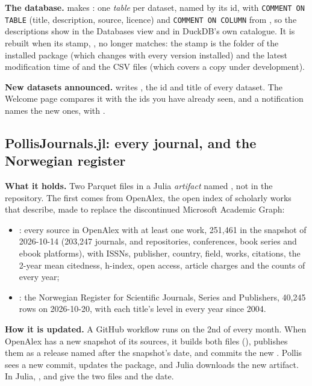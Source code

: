 \textbf{The database.}  makes : one
\emph{table} per dataset, named by its id, with \texttt{\small COMMENT ON TABLE} (title, description, source, licence) and
\texttt{\small COMMENT ON COLUMN} from , so the descriptions show in the Databases view and in DuckDB's own
catalogue. It is rebuilt when its stamp, , no longer matches: the stamp is the
folder of the installed package (which changes with every version installed) and the latest modification time of
 and the CSV files (which covers a copy under development).

\textbf{New datasets announced.}  writes ,
the id and title of every dataset. The Welcome page compares it with the ids you have already seen, and a notification
names the new ones, with .

\subsection{PollisJournals.jl: every journal, and the Norwegian register}
\textbf{What it holds.} Two Parquet files in a Julia \emph{artifact} named , not in the repository. The
first comes from OpenAlex, the open index of scholarly works that 
describe, made to replace the discontinued Microsoft Academic Graph:
\begin{itemize}
  \item {}: every source in OpenAlex with at least one work, 251,461 in the snapshot of
    2026-10-14 (203,247 journals, and repositories, conferences, book series and ebook platforms), with ISSNs,
    publisher, country, field, works, citations, the 2-year mean citedness, h-index, open access, article charges and
    the counts of every year;
  \item {}: the Norwegian Register for Scientific Journals, Series and Publishers, 40,245 rows on
    2026-10-20, with each title's level in every year since 2004.
\end{itemize}

\textbf{How it is updated.} A GitHub workflow runs on the 2nd of every month. When OpenAlex has a new snapshot of its
sources, it builds both files (), publishes them as a release named after the snapshot's date, and
commits the new . Pollis sees a new commit, updates the package, and Julia downloads the new
artifact. In Julia, ,  and  give the two files and the
date.

